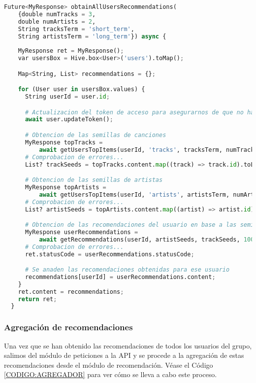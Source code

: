 \begin{lstlisting}[language=python, caption=Obtención de recomendaciones para un usuario, label=CODIGO:OBTENCION_RECOMENDACIONES]
  Future<MyResponse> obtainAllUsersRecommendations(
    {double numTracks = 3,
    double numArtists = 2,
    String tracksTerm = 'short_term',
    String artistsTerm = 'long_term'}) async {
    
    MyResponse ret = MyResponse();
    var usersBox = Hive.box<User>('users').toMap();

    Map<String, List> recommendations = {};

    for (User user in usersBox.values) {
      String userId = user.id;

      # Actualizacion del token de acceso para asegurarnos de que no haya problemas
      await user.updateToken();

      # Obtencion de las semillas de canciones
      MyResponse topTracks =
          await getUsersTopItems(userId, 'tracks', tracksTerm, numTracks);
      # Comprobacion de errores...
      List? trackSeeds = topTracks.content.map((track) => track.id).toList();

      # Obtencion de las semillas de artistas
      MyResponse topArtists =
          await getUsersTopItems(userId, 'artists', artistsTerm, numArtists);
      # Comprobacion de errores...
      List? artistSeeds = topArtists.content.map((artist) => artist.id).toList();

      # Obtencion de las recomendaciones del usuario en base a las semillas obtenidas
      MyResponse userRecommendations =
          await getRecommendations(userId, artistSeeds, trackSeeds, 100);
      # Comprobacion de errores...
      ret.statusCode = userRecommendations.statusCode;

      # Se anaden las recomendaciones obtenidas para ese usuario
      recommendations[userId] = userRecommendations.content;
    }
    ret.content = recommendations;
    return ret;
  }
\end{lstlisting}


\subsubsection{Agregación de recomendaciones\label{subsec:agregacion_recomendaciones_implementacion}}

Una vez que se han obtenido las recomendaciones de todos los usuarios del grupo, salimos del módulo de peticiones a la API 
y se procede a la agregación de estas recomendaciones desde el módulo de recomendación. Véase el Código \ref{CODIGO:AGREGADOR} 
para ver cómo se lleva a cabo este proceso. 

